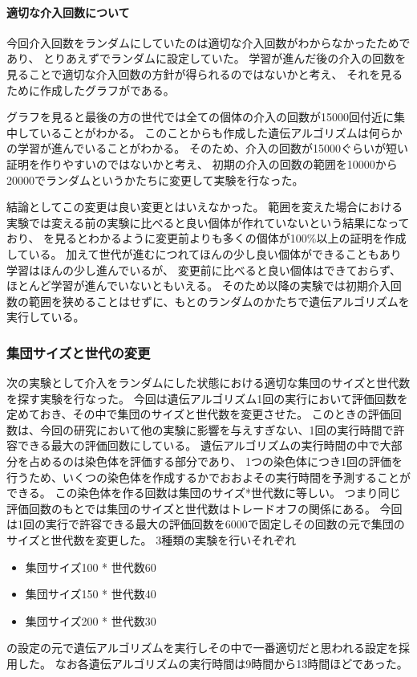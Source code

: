 \paragraph{適切な介入回数について}

今回介入回数をランダムにしていたのは適切な介入回数がわからなかったためであり、
とりあえずでランダムに設定していた。
学習が進んだ後の介入の回数を見ることで適切な介入回数の方針が得られるのではないかと考え、
それを見るために作成したグラフがである。


グラフを見ると最後の方の世代では全ての個体の介入の回数が15000回付近に集中していることがわかる。
このことからも作成した遺伝アルゴリズムは何らかの学習が進んでいることがわかる。
そのため、介入の回数が15000ぐらいが短い証明を作りやすいのではないかと考え、
初期の介入の回数の範囲を10000から20000でランダムというかたちに変更して実験を行なった。


結論としてこの変更は良い変更とはいえなかった。
範囲を変えた場合における実験では変える前の実験に比べると良い個体が作れていないという結果になっており、
を見るとわかるように変更前よりも多くの個体が100\%以上の証明を作成している。
加えて世代が進むにつれてほんの少し良い個体ができることもあり学習はほんの少し進んでいるが、
変更前に比べると良い個体はできておらず、ほとんど学習が進んでいないともいえる。
そのため以降の実験では初期介入回数の範囲を狭めることはせずに、もとのランダムのかたちで遺伝アルゴリズムを実行している。



\subsubsection{集団サイズと世代の変更}
次の実験として介入をランダムにした状態における適切な集団のサイズと世代数を探す実験を行なった。
今回は遺伝アルゴリズム1回の実行において評価回数を定めておき、その中で集団のサイズと世代数を変更させた。
このときの評価回数は、今回の研究において他の実験に影響を与えすぎない、1回の実行時間で許容できる最大の評価回数にしている。
遺伝アルゴリズムの実行時間の中で大部分を占めるのは染色体を評価する部分であり、
1つの染色体につき1回の評価を行うため、いくつの染色体を作成するかでおおよその実行時間を予測することができる。
この染色体を作る回数は集団のサイズ*世代数に等しい。
つまり同じ評価回数のもとでは集団のサイズと世代数はトレードオフの関係にある。
今回は1回の実行で許容できる最大の評価回数を6000で固定しその回数の元で集団のサイズと世代数を変更した。
3種類の実験を行いそれぞれ
\begin{itemize}
    \item 集団サイズ100 * 世代数60
    \item 集団サイズ150 * 世代数40
    \item 集団サイズ200 * 世代数30
\end{itemize}
の設定の元で遺伝アルゴリズムを実行しその中で一番適切だと思われる設定を採用した。
なお各遺伝アルゴリズムの実行時間は9時間から13時間ほどであった。

